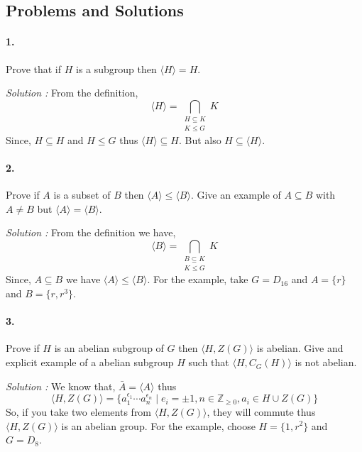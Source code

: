 \eject

\subsection*{Problems and Solutions}

\paragraph{1.}  Prove that if $H$ is a subgroup then $\langle H \rangle = H$.

\vspace{4mm}
\textit{Solution :} From the definition,
\[ \langle H \rangle = \bigcap_{\substack{H \subseteq K \\ K \le G}} K \]
Since, $H \subseteq H$ and $H \le G$ thus $\langle H \rangle \subseteq H$. But also $H \subseteq \langle H \rangle$.

\paragraph{2.} Prove if $A$ is a subset of $B$ then $\langle A \rangle \le \langle B \rangle$. Give an example of $A \subseteq B$
with $A \neq B$ but $\langle A \rangle = \langle B \rangle$.

\vspace{4mm}
\textit{Solution :} From the definition we have,
\[ \langle B \rangle = \bigcap_{\substack{B \subseteq K \\ K \le G}} K \]
Since, $A \subseteq B$ we have $\langle A \rangle \le \langle B \rangle$. For the example, take $G=D_{16}$ and 
$A = \{r\}$ and $B=\{r,r^3\}$.

\paragraph{3.} Prove if $H$ is an abelian subgroup of $G$ then $\langle H, Z(G) \rangle$ is abelian. Give and explicit example 
of a abelian subgroup $H$ such that $\langle H, C_G(H) \rangle$ is not abelian.

\vspace{4mm}
\textit{Solution :} We know that, $\bar{A}=\langle A \rangle$ thus 
\[ \langle H,Z(G) \rangle = \{a_1^{\epsilon_1} \cdots a_n^{\epsilon_n}
\mid e_i = \pm 1 , n \in \mathbb{Z}_{\ge 0}, a_i \in H \cup Z(G) \}
\]
So, if you take two elements from $\langle H, Z(G) \rangle$, they will commute thus $\langle H, Z(G) \rangle$ is an abelian group.
For the example, choose $H=\{1,r^2\}$ and $G=D_8$.

